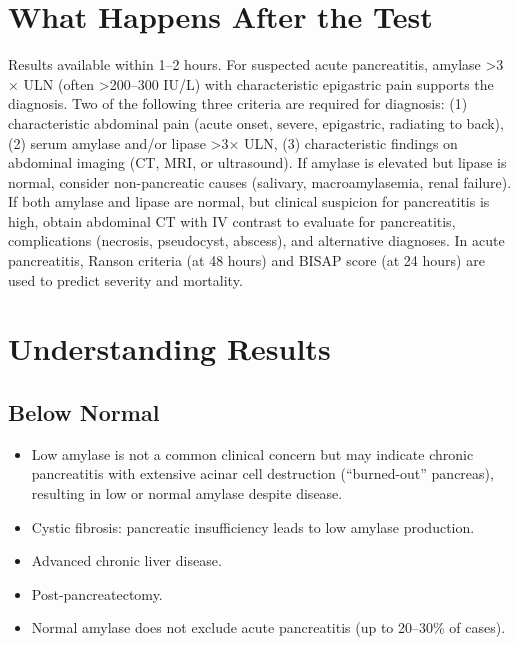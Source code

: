 \section*{What Happens After the Test}
Results available within 1--2 hours. For suspected acute pancreatitis, amylase >3$\times$ ULN (often >200--300 IU/L) with characteristic epigastric pain supports the diagnosis. Two of the following three criteria are required for diagnosis: (1) characteristic abdominal pain (acute onset, severe, epigastric, radiating to back), (2) serum amylase and/or lipase >3$\times$ ULN, (3) characteristic findings on abdominal imaging (CT, MRI, or ultrasound). If amylase is elevated but lipase is normal, consider non-pancreatic causes (salivary, macroamylasemia, renal failure). If both amylase and lipase are normal, but clinical suspicion for pancreatitis is high, obtain abdominal CT with IV contrast to evaluate for pancreatitis, complications (necrosis, pseudocyst, abscess), and alternative diagnoses. In acute pancreatitis, Ranson criteria (at 48 hours) and BISAP score (at 24 hours) are used to predict severity and mortality.

\section*{Understanding Results}

\subsection*{Below Normal}
\begin{itemize}
  \item Low amylase is not a common clinical concern but may indicate chronic pancreatitis with extensive acinar cell destruction (``burned-out'' pancreas), resulting in low or normal amylase despite disease.
  \item Cystic fibrosis: pancreatic insufficiency leads to low amylase production.
  \item Advanced chronic liver disease.
  \item Post-pancreatectomy.
  \item Normal amylase does not exclude acute pancreatitis (up to 20--30\% of cases).
\end{itemize}

